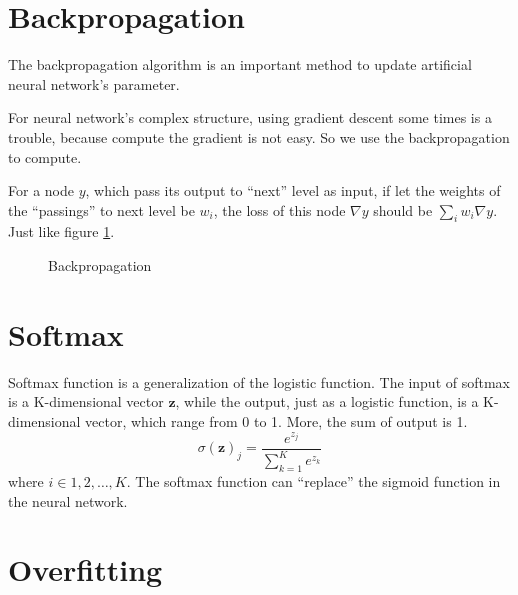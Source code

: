 \documentclass{article}
\begin{document}
\section{Backpropagation}
\label{sec:bp}

The backpropagation algorithm is an important method to update artificial neural network's parameter. 

For neural network's complex structure, using gradient descent some times is a trouble, because
compute the gradient is not easy. So we use the backpropagation to compute.

For a node $y$, which pass its output to ``next'' level as input,
if let the weights of the ``passings'' to next level be $w_i$, the 
loss of this node $\nabla y$ should be $\sum\limits_{i}w_i\nabla y$.
Just like figure \ref{fig:bp:1}.

\begin{figure}
    \centering
    \caption{Backpropagation}
    \label{fig:bp:1}
\end{figure}


\section{Softmax}
\label{sec:softmax}

Softmax function is a generalization of the logistic function.
The input of softmax is a K-dimensional vector $\mathbf{z}$,
while the output, just as a logistic function, is a K-dimensional vector,
which range from 0 to 1. More, the sum of output is 1.
\begin{equation}
\sigma(\mathbf{z})_j = \frac{e^{z_j}}{\sum_{k=1}^{K}e^{z_k}}
\end{equation}
where $i \in 1,2,\dots,K$.
The softmax function can ``replace'' the sigmoid function in the neural network.


\section{Overfitting}
\label{sec:of}
\end{document}
